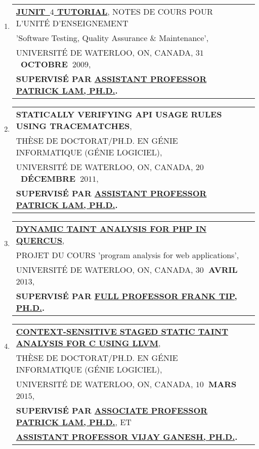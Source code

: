 \documentclass[9pt,a4paper]{article} %
\makeatletter
\newcommand{\headerrow}[2]
{\begin{tabular*}{\linewidth}{l@{\extracolsep{\fill}}r}
	#1 &
	#2 \\
\end{tabular*}}
\newcommand{\headerrowONE}[1]{\headerrow{#1}{}}
\makeatother
\begin{document}
\begin{enumerate}
\item \headerrowONE{\href{http://archive.org/details/junit-by-xavier-noumbissi-noundou}{
	\textbf{JUNIT~$4$ TUTORIAL}}, NOTES DE COURS POUR L'UNITÉ D'ENSEIGNEMENT \\
	'Software Testing, Quality Assurance \& Maintenance',\\
	UNIVERSITÉ DE WATERLOO, ON, CANADA, \textbf{$31$~OCTOBRE~$2009$},\\
	\textbf{SUPERVISÉ PAR \href{http://patricklam.ca}{ASSISTANT PROFESSOR PATRICK LAM, PH.D.}.}}
 
\item \headerrowONE{\textbf{STATICALLY VERIFYING API USAGE RULES USING TRACEMATCHES},\\
	THÈSE DE DOCTORAT/PH.D. EN GÉNIE INFORMATIQUE (GÉNIE LOGICIEL),\\
	UNIVERSITÉ DE WATERLOO, ON, CANADA, \textbf{$20$~DÉCEMBRE~$2011$},\\
	\textbf{SUPERVISÉ PAR \href{http://patricklam.ca}{ASSISTANT PROFESSOR PATRICK LAM, PH.D.}.}}

\item \headerrowONE{\href{http://archive.org/details/cs846-nnoumbissi}{
	\textbf{DYNAMIC TAINT ANALYSIS FOR PHP IN QUERCUS}},\\
	PROJET DU COURS 'program analysis for web applications',\\
	UNIVERSITÉ DE WATERLOO, ON, CANADA, \textbf{$30$~AVRIL~$2013$},\\
	\textbf{SUPERVISÉ PAR \href{http://www.franktip.org}{FULL PROFESSOR FRANK TIP, PH.D.}.}}


\item \headerrowONE{\href{http://archive.org/details/saint_201507}{
	\textbf{CONTEXT-SENSITIVE STAGED STATIC TAINT ANALYSIS FOR C USING LLVM}},\\
	THÈSE DE DOCTORAT/PH.D. EN GÉNIE INFORMATIQUE (GÉNIE LOGICIEL),\\
	UNIVERSITÉ DE WATERLOO, ON, CANADA, \textbf{$10$~MARS~$2015$},\\
	\textbf{SUPERVISÉ PAR \href{http://patricklam.ca}{ASSOCIATE PROFESSOR PATRICK LAM, PH.D.}}, ET\\
	\textbf{\href{http://ece.uwaterloo.ca/~vganesh}{ASSISTANT PROFESSOR VIJAY GANESH, PH.D.}.}}
\end{enumerate}
\end{document}
